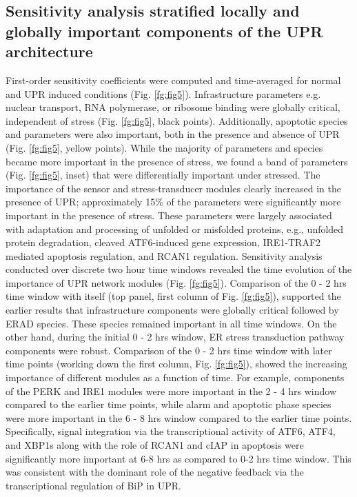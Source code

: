 \documentclass[fleqn,10pt]{wlscirep}
\begin{document}
\subsection*{Sensitivity analysis stratified locally and globally important components of the UPR architecture}
First-order sensitivity coefficients were computed and time-averaged for normal and UPR induced conditions (Fig. \ref{fg:fig5}).
Infrastructure parameters e.g. nuclear transport, RNA polymerase, or ribosome binding were globally critical, independent of stress (Fig. \ref{fg:fig5}, black points).
Additionally, apoptotic species and parameters were also important, both in the presence and absence of UPR (Fig. \ref{fg:fig5}, yellow points).
While the majority of parameters and species became more important in the presence of stress, we found a band of parameters (Fig. \ref{fg:fig5}, inset) that were differentially important under stressed.
The importance of the sensor and stress-transducer modules clearly increased in the presence of UPR; approximately 15\% of the parameters were significantly more important in the presence of stress.
These parameters were largely associated with adaptation and processing of unfolded or misfolded proteins, e.g., unfolded protein degradation, cleaved ATF6-induced gene expression, IRE1-TRAF2 mediated apoptosis regulation, and RCAN1 regulation.
Sensitivity analysis conducted over discrete two hour time windows revealed the time evolution of the importance of UPR network modules (Fig. \ref{fg:fig5}).
Comparison of the 0 - 2 hrs time window with itself (top panel, first column of Fig. \ref{fg:fig5}), supported the earlier results that infrastructure components were globally critical followed by ERAD species.
These species remained important in all time windows. On the other hand, during the initial 0 - 2 hrs window, ER stress transduction pathway components were robust.
Comparison of the 0 - 2 hrs time window with later time points (working down the first column, Fig. \ref{fg:fig5}), showed the increasing importance of different modules as a function of time.
For example, components of the PERK and IRE1 modules were more important in the 2 - 4 hrs window compared to the earlier time points, while alarm and apoptotic phase species were more important in the 6 - 8 hrs window compared to the earlier time points.
Specifically, signal integration via the transcriptional activity of ATF6, ATF4, and XBP1s along with the role of RCAN1 and cIAP in apoptosis were significantly more important at 6-8 hrs as compared to 0-2 hrs time window.
This was consistent with the dominant role of the negative feedback via the transcriptional regulation of BiP in UPR.
\end{document}
